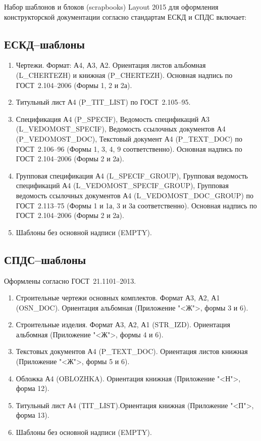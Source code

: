 \documentclass[oneside,final,14pt]{extreport}
\begin{document}
Набор шаблонов и блоков (scrapbooks) Layout 2015 для оформления конструкторской документации согласно стандартам ЕСКД и СПДС включает:

	\subsection{ЕСКД--шаблоны}
	\begin{enumerate}
		\item Чертежи. Формат: А4, А3, А2. Ориентация листов альбомная (\textsf{L\_CHERTEZH}) и книжная (\textsf{P\_CHERTEZH}). Основная надпись по ГОСТ~2.104--2006 (Формы 1, 2 и 2а).
		\item Титульный лист А4 (\textsf{P\_TIT\_LIST}) по ГОСТ~2.105--95.
		\item Спецификация А4 (\textsf{P\_SPECIF}), Ведомость спецификаций А3 (\textsf{L\_VEDOMOST\_SPECIF}), Ведомость ссылочных документов А4 (\textsf{P\_VEDOMOST\_DOC}), Текстовый документ А4 (\textsf{P\_TEXT\_DOC}) по ГОСТ~2.106--96 (Формы 1, 3, 4, 9 соответственно). Основная надпись по ГОСТ~2.104--2006 (Формы 2 и 2а).
		\item Групповая спецификация А4 (\textsf{L\_SPECIF\_GROUP}), Групповая ведомость спецификаций А4  (\textsf{L\_VEDOMOST\_SPECIF\_GROUP}), Групповая ведомость ссылочных документов А4 (\textsf{L\_VEDOMOST\_DOC\_GROUP}) по ГОСТ~2.113--75 (Формы 1 и 1а, 3 и 3а соответственно).  Основная надпись по ГОСТ~2.104--2006 (Формы 2 и 2а).
		\item Шаблоны без основной надписи (\textsf{EMPTY}).
	\end{enumerate}

	\subsection{СПДС--шаблоны}

	Оформлены согласно ГОСТ~21.1101--2013.
	\begin{enumerate}
		\item Строительные чертежи основных комплектов. Формат А3, А2, А1 (\textsf{OSN\_DOC}). Ориентация альбомная (Приложение "<Ж">, формы 3 и 6).
		\item Строительные изделия. Формат А3, А2, А1 (\textsf{STR\_IZD}). Ориентация альбомная (Приложение "<Ж">, формы 4 и 6).
		\item Текстовых документов А4 (\textsf{P\_TEXT\_DOC}). Ориентация листов книжная (Приложение "<Ж">, формы 5 и 6).
		\item Обложка А4 (\textsf{OBLOZHKA}). Ориентация книжная (Приложение "<Н">, форма 12).
		\item Титульный лист А4 (\textsf{TIT\_LIST}).Ориентация книжная (Приложение "<П">, форма 13).
		\item Шаблоны без основной надписи (\textsf{EMPTY}).
	\end{enumerate}
\end{document}
